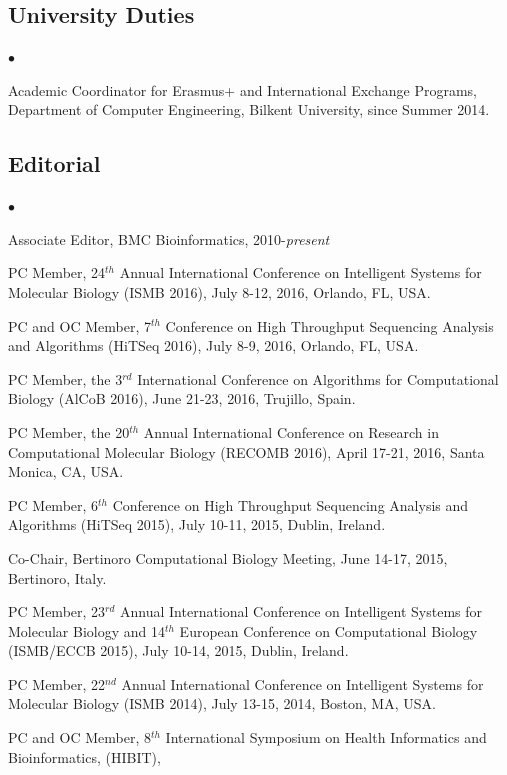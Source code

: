 \documentclass[margin,line]{res}
\newenvironment{list2}{
  \begin{list}{$\bullet$}{%
      \setlength{\itemsep}{0in}
      \setlength{\parsep}{0in} \setlength{\parskip}{0in}
      \setlength{\topsep}{0in} \setlength{\partopsep}{0in} 
      \setlength{\leftmargin}{0.2in}}}{\end{list}}
\begin{document}
\begin{resume}
\subsection{\small \sc University Duties}
\begin{list2}
\item
  Academic Coordinator for Erasmus+ and International Exchange Programs, Department of Computer Engineering, Bilkent University, since Summer 2014.
\end{list2}
\vspace{-0.6cm}

\subsection{\small \sc Editorial}
\begin{list2}
\item
  Associate Editor, BMC Bioinformatics, 2010-{\it present}
\item
  PC Member, 24$^{th}$ Annual International Conference on Intelligent Systems for Molecular Biology  (ISMB 2016), July 8-12, 2016, Orlando, FL, USA.
\item
  PC and OC Member, 7$^{th}$ Conference on High Throughput Sequencing Analysis and Algorithms (HiTSeq 2016), July 8-9, 2016, Orlando, FL, USA.
\item
  PC Member, the 3$^{rd}$ International Conference on Algorithms for Computational Biology (AlCoB 2016),
  June 21-23, 2016, Trujillo, Spain.
\item
  PC Member, the 20$^{th}$ Annual International Conference on Research in Computational Molecular Biology
  (RECOMB 2016), April 17-21, 2016, Santa Monica, CA, USA.
\item
  PC Member, 6$^{th}$ Conference on High Throughput Sequencing Analysis and Algorithms (HiTSeq 2015), July 10-11, 2015, Dublin, Ireland.
\item
  Co-Chair, Bertinoro Computational Biology Meeting, June 14-17, 2015, Bertinoro, Italy.
\item
  PC Member, 23$^{rd}$ Annual International Conference on Intelligent Systems for Molecular Biology and 14$^{th}$ European Conference on 
  Computational Biology  (ISMB/ECCB 2015), 
  July 10-14, 2015, Dublin, Ireland.
\item
  PC Member, 22$^{nd}$ Annual International Conference on Intelligent Systems for Molecular Biology 
  (ISMB 2014), 
  July 13-15, 2014, Boston, MA, USA.
\item
  PC and OC Member, 8$^{th}$  International Symposium on Health Informatics and Bioinformatics, (HIBIT),

\end{list2}
\end{resume}
\end{document}
